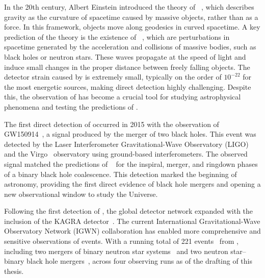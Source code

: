 In the 20th century, Albert Einstein introduced the theory of \GR~\cite{Einstein_1:1914, Einstein_2:1914, Einstein_3:1914, Einstein_4:1915, Einstein_5:1916, Einstein_6:1917, Einstein_7:1936}, which describes gravity as the curvature of spacetime caused by massive objects, rather than as a force. In this framework, objects move along geodesics in curved spacetime. A key prediction of the theory is the existence of \gws~\cite{Einstein_8:1937, Einstein_9:1938, Einstein_10:1939, Einstein_11:1948}, which are perturbations in spacetime generated by the acceleration and collisions of massive bodies, such as black holes or neutron stars. These waves propagate at the speed of light and induce small changes in the proper distance between freely falling objects. The detector strain caused by \gws is extremely small, typically on the order of $10^{-22}$ for the most energetic sources, making direct detection highly challenging. Despite this, the observation of \gws has become a crucial tool for studying astrophysical phenomena and testing the predictions of \GR.

The first direct detection of \gws occurred in 2015 with the observation of GW150914~\cite{GW150914:2016}, a \gwadj signal produced by the merger of two black holes. This event was detected by the Laser Interferometer Gravitational-Wave Observatory (LIGO) and the Virgo~\cite{aVirgo:2015} \gwadj observatory using ground-based interferometers. The observed signal matched the predictions of \GR~\cite{GW150914_TGR:2016} for the inspiral, merger, and ringdown phases of a binary black hole coalescence. This detection marked the beginning of \gwadj astronomy, providing the first direct evidence of black hole mergers and opening a new observational window to study the Universe.

Following the first detection of \gws, the global \gwadj detector network expanded with the inclusion of the KAGRA detector~\cite{KAGRA:2021}. The current International Gravitational-Wave Observatory Network (IGWN) collaboration has enabled more comprehensive and sensitive observations of \gwadj events. With a running total of 221 \gwadj events~\cite{gwtc1:2019, gwtc2:2021, gwtc21:2024, gwtc3:2023, 1OGC:2018, 2OGC:2020, 3OGC:2021, 4OGC:2021, Princeton_1:2019, Princeton_2:2019, Princeton_3a:2022, Princeton_3b:2023, gracedb_superevents:2024} from \cbcs, including two mergers of binary neutron star systems~\cite{GW170817:2017, GW190425:2020} and two neutron star–binary black hole mergers~\cite{nsbh:2021}, across four observing runs as of the drafting of this thesis.

